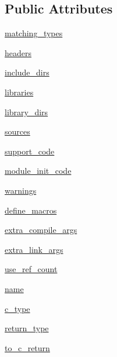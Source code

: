 \subsection*{Public Attributes}
\begin{DoxyCompactItemize}
\item 
\hyperlink{classscipy_1_1weave_1_1c__spec_1_1common__base__converter_a6e719349fa98e59f5ddeaf8c505c88fa}{matching\+\_\+types}
\item 
\hyperlink{classscipy_1_1weave_1_1c__spec_1_1common__base__converter_a17310284488200664d96ca4db5855507}{headers}
\item 
\hyperlink{classscipy_1_1weave_1_1c__spec_1_1common__base__converter_a3fd6440501147c270dee8ae2a3937dde}{include\+\_\+dirs}
\item 
\hyperlink{classscipy_1_1weave_1_1c__spec_1_1common__base__converter_a0e8f040879b906d8d42fca19bfd48d48}{libraries}
\item 
\hyperlink{classscipy_1_1weave_1_1c__spec_1_1common__base__converter_a41eb4bcf00ae37d2458346be895a39dd}{library\+\_\+dirs}
\item 
\hyperlink{classscipy_1_1weave_1_1c__spec_1_1common__base__converter_a25fc3e4941af65d6744aaf54d8b7785b}{sources}
\item 
\hyperlink{classscipy_1_1weave_1_1c__spec_1_1common__base__converter_ac8a9d0dd936a2cfc83caaa84cd7d1058}{support\+\_\+code}
\item 
\hyperlink{classscipy_1_1weave_1_1c__spec_1_1common__base__converter_a8515694bc706c25ccdec13e03273a2ae}{module\+\_\+init\+\_\+code}
\item 
\hyperlink{classscipy_1_1weave_1_1c__spec_1_1common__base__converter_a545d2128e02f6254bdf5d73c39281616}{warnings}
\item 
\hyperlink{classscipy_1_1weave_1_1c__spec_1_1common__base__converter_a26dfb6fdc350c72099ae26e5f24dc80a}{define\+\_\+macros}
\item 
\hyperlink{classscipy_1_1weave_1_1c__spec_1_1common__base__converter_a9cf8f5c04a757cc33d5ce156583803bd}{extra\+\_\+compile\+\_\+args}
\item 
\hyperlink{classscipy_1_1weave_1_1c__spec_1_1common__base__converter_a8e37169e266d2a6907e20ca460cf9758}{extra\+\_\+link\+\_\+args}
\item 
\hyperlink{classscipy_1_1weave_1_1c__spec_1_1common__base__converter_a043989ff4e9f8e6675d3692bfbddc76f}{use\+\_\+ref\+\_\+count}
\item 
\hyperlink{classscipy_1_1weave_1_1c__spec_1_1common__base__converter_a7108deb2d22c86d06eaf1e5c73b0cd2f}{name}
\item 
\hyperlink{classscipy_1_1weave_1_1c__spec_1_1common__base__converter_a834d408f83ee6723ee6f2933e4d28467}{c\+\_\+type}
\item 
\hyperlink{classscipy_1_1weave_1_1c__spec_1_1common__base__converter_a4f3d0cb0224d1cbbab4edffe911664f2}{return\+\_\+type}
\item 
\hyperlink{classscipy_1_1weave_1_1c__spec_1_1common__base__converter_a0b27e2332e5a6489410e44a73b781f91}{to\+\_\+c\+\_\+return}
\end{DoxyCompactItemize}


